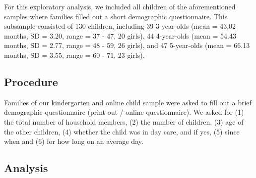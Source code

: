 \documentclass[
  man,floatsintext]{apa6}
\begin{document}
For this exploratory analysis, we included all children of the aforementioned samples where families filled out a short demographic questionnaire. This subsample consisted of
130 children, including
39 3-year-olds
(mean = 43.02 months,
SD = 3.20,
range = 37
- 47,
20 girls),
44 4-year-olds
(mean = 54.43 months,
SD = 2.77,
range = 48
- 59,
26 girls),
and 47 5-year-olds
(mean = 66.13 months,
SD = 3.55,
range = 60
- 71,
23 girls).

\hypertarget{procedure-2}{%
\subsection{Procedure}\label{procedure-2}}

Families of our kindergarten and online child sample were asked to fill out a brief demographic questionnaire (print out / online questionnaire). We asked for (1) the total number of household members, (2) the number of children, (3) age of the other children, (4) whether the child was in day care, and if yes, (5) since when and (6) for how long on an average day.

\hypertarget{analysis-2}{%
\subsection{Analysis}\label{analysis-2}}
\end{document}
